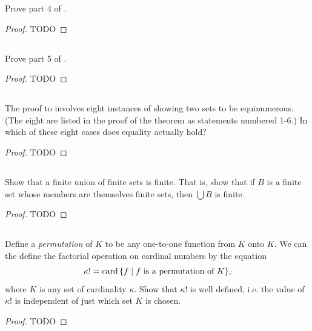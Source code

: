 \documentclass{report}
\begin{document}
  Prove part 4 of .

  \begin{proof}
    TODO
  \end{proof}

\subsection{}%

  Prove part 5 of .

  \begin{proof}
    TODO
  \end{proof}

\subsection{}%

  The proof to  involves eight instances of showing two
    sets to be equinumerous.
  (The eight are listed in the proof of the theorem as statements numbered 1-6.)
  In which of these eight cases does equality actually hold?

  \begin{proof}
    TODO
  \end{proof}

\subsection{}%

  Show that a finite union of finite sets is finite.
  That is, show that if $B$ is a finite set whose members are themselves finite
    sets, then $\bigcup{B}$ is finite.

  \begin{proof}
    TODO
  \end{proof}

\subsection{}%

  Define a \textit{permutation} of $K$ to be any one-to-one function from $K$
    onto $K$.
  We can the define the factorial operation on cardinal numbers by the equation
    $$\kappa! = \mathop{\text{card}}{\{f \mid f \text{ is a permutation of } K\}},$$
    where $K$ is any set of cardinality $\kappa$.
  Show that $\kappa!$ is well defined, i.e. the value of $\kappa!$ is
    independent of just which set $K$ is chosen.

  \begin{proof}
    TODO
  \end{proof}
\end{document}

